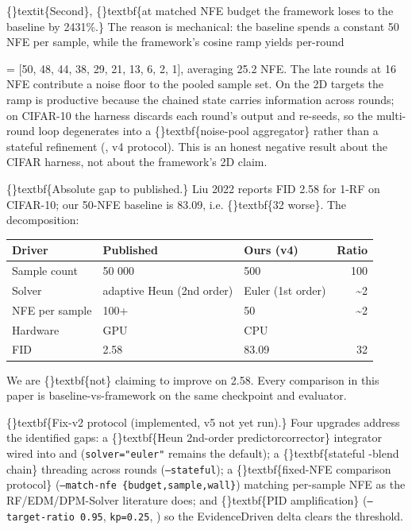 \documentclass{article}
\begin{document}
\{\}textit\{Second\}, \{\}textbf\{at matched NFE budget the framework loses to the baseline by 2431\%.\} The reason is mechanical: the baseline spends a constant 50 NFE per sample, while the framework's cosine ramp yields per-round

 = [50, 48, 44, 38, 29, 21, 13, 6, 2, 1], averaging 25.2 NFE. The late rounds at 16 NFE contribute a noise floor to the pooled sample set. On the 2D targets the ramp is productive because the chained state carries information across rounds; on CIFAR-10 the harness discards each round's output and re-seeds, so the multi-round loop degenerates into a \{\}textbf\{noise-pool aggregator\} rather than a stateful refinement (, v4 protocol). This is an honest negative result about the CIFAR harness, not about the framework's 2D claim.

\{\}textbf\{Absolute gap to published.\} Liu 2022 reports FID 2.58 for 1-RF on CIFAR-10; our 50-NFE baseline is 83.09, i.e. \{\}textbf\{32 worse\}. The decomposition:

\begin{table}[ht]
\centering
\small
\begin{tabular}{lllr}
\hline
\textbf{Driver} & \textbf{Published} & \textbf{Ours (v4)} & \textbf{Ratio} \\
\hline
Sample count & 50 000 & 500 & 100 \\
Solver & adaptive Heun (2nd order) & Euler (1st order) & \textasciitilde{}2 \\
NFE per sample & 100+ & 50 & \textasciitilde{}2 \\
Hardware & GPU & CPU &  \\
FID & 2.58 & 83.09 & 32 \\
\hline
\end{tabular}
\end{table}

We are \{\}textbf\{not\} claiming to improve on 2.58. Every comparison in this paper is baseline-vs-framework on the same checkpoint and evaluator.

\{\}textbf\{Fix-v2 protocol (implemented, v5 not yet run).\} Four upgrades address the identified gaps: a \{\}textbf\{Heun 2nd-order predictorcorrector\} integrator wired into  and  (\texttt{solver="euler"} remains the default); a \{\}textbf\{stateful -blend chain\} threading  across rounds (\texttt{--stateful}); a \{\}textbf\{fixed-NFE comparison protocol\} (\texttt{--match-nfe \{budget,sample,wall\}}) matching per-sample NFE as the RF/EDM/DPM-Solver literature does; and \{\}textbf\{PID amplification\} (\texttt{--target-ratio 0.95}, \texttt{kp=0.25}, ) so the EvidenceDriven delta clears the  threshold.
\end{document}
